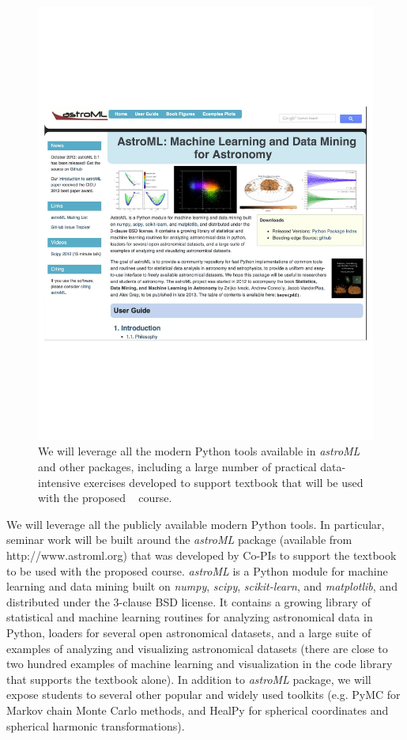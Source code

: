 \begin{figure}[!t]
\vskip -1.8in
\includegraphics[width=1.02\hsize,clip]{astroML.pdf}
\vskip -2.0in
\caption{We will leverage all the modern Python tools available in {\it astroML} and
other packages, including a large number of practical data-intensive exercises developed to
support textbook that will be used with the proposed \astrocl~ course.} 
\label{Fig:astroML}
\end{figure}


We will leverage all the publicly available modern Python tools. In particular, seminar work will be 
built around the {\it astroML} package (available from http://www.astroml.org) that was developed 
by Co-PIs to support the textbook to be used with the proposed \astrocl course. {\it astroML} is a Python module 
for machine learning and data mining built on {\it numpy}, {\it scipy}, {\it scikit-learn}, and {\it matplotlib}, 
and distributed under the 3-clause BSD license. It contains a growing library of statistical and machine 
learning routines for analyzing astronomical data in Python, loaders for several open astronomical datasets, 
and a large suite of examples of analyzing and visualizing astronomical datasets (there are close to two 
hundred examples of machine learning and visualization in the code library that supports the textbook 
alone). In addition to  {\it astroML} package, we will expose students to several other popular and widely
used toolkits (e.g. PyMC for Markov chain Monte Carlo methods, and HealPy for spherical coordinates 
and spherical harmonic transformations). 

